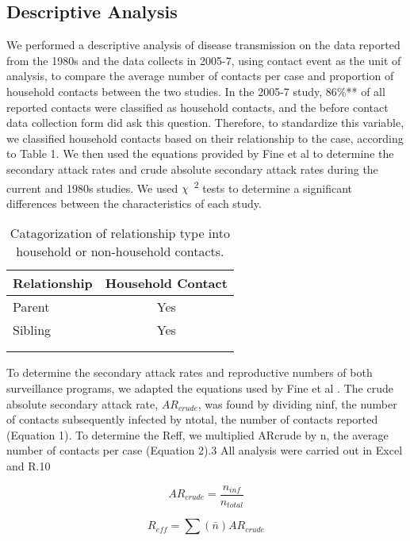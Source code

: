 \subsection{Descriptive Analysis}
We performed a descriptive analysis of disease transmission on the data reported from the 1980s and the data collects in 2005-7, using contact event as the unit of analysis, to compare the average number of contacts per case and proportion of household contacts between the two studies. In the 2005-7 study, 86\%** of all reported contacts were classified as household contacts, and the before contact data collection form did ask this question. Therefore, to standardize this variable, we classified household contacts based on their relationship to the case, according to Table 1. We then used the equations provided by Fine et al \cite{Fine1988} to determine the secondary attack rates and crude absolute secondary attack rates during the current and 1980s studies. We used $\chi$\ \textsuperscript{2} tests to determine a significant differences between the characteristics of each study.

\begin{table} 
\centering
\caption{Catagorization of relationship type into household or non-household contacts.} 
    \begin{tabular}{ l c }
    \toprule
        Relationship & Household Contact \\ 
        \midrule
        Parent & Yes \\ 
        Sibling & Yes \\ 
         &  \\ 
         &  \\ 
         \bottomrule
    \end{tabular} 
\end{table}

To determine the secondary attack rates and reproductive numbers of both surveillance programs, we adapted the equations used by Fine et al \cite{Fine1988}. 
The crude absolute secondary attack rate, $AR_{crude}$, was found by dividing ninf, the number of contacts subsequently infected by ntotal, the number of contacts reported (Equation 1). To determine the Reff, we multiplied ARcrude by n, the average number of contacts per case (Equation 2).3  All analysis were carried out in Excel and R.10

\begin{equation}
\label{eqn:equation 1}
AR_{crude}=\frac{n_{inf}}{n_{total}}
\end{equation}

\begin{equation}
\label{eqn:equation 2}
R_{eff}=\sum \left ( \bar{n} \right )AR_{crude}
\end{equation}